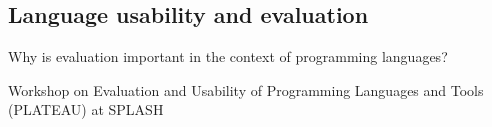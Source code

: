 
\subsection{Language usability and evaluation}
\label{sub: evaluation}
Why is evaluation important in the context of programming languages?

Workshop on Evaluation and Usability of Programming Languages and Tools (PLATEAU) at SPLASH


